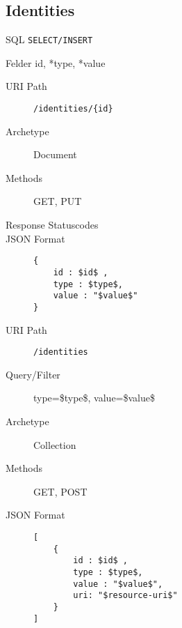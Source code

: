 \documentclass[10pt,a4paper]{scrartcl}
\begin{document}
\pagebreak
\subsection{Identities}

\begin{description*}
    \item[SQL] \texttt{SELECT/INSERT}
    \item[Felder] id, *type, *value
\end{description*}


\begin{mdframed}[style=def]
\begin{description}
	\item[URI Path] \texttt{/identities/\{id\}}
	\item[Archetype] Document
	\item[Methods] GET, PUT
	\item[Response Statuscodes] \hfill
	\item[JSON Format] \hfill
\begin{lstlisting}
{
	id : $id$ ,
	type : $type$,
	value : "$value$"
}
\end{lstlisting}
\end{description}
\end{mdframed}

\begin{mdframed}[style=def]
\begin{description}
	\item[URI Path] \texttt{/identities}
	\item[Query/Filter]	type=\$type\$, value=\$value\$ 
	\item[Archetype] Collection
	\item[Methods] GET, POST
	\item[JSON Format] \hfill
\begin{lstlisting}
[
	{
	    id : $id$ ,
	    type : $type$,
	    value : "$value$",
	    uri: "$resource-uri$"
    }
]
\end{lstlisting}
\end{description}
\end{mdframed}
\end{document}
